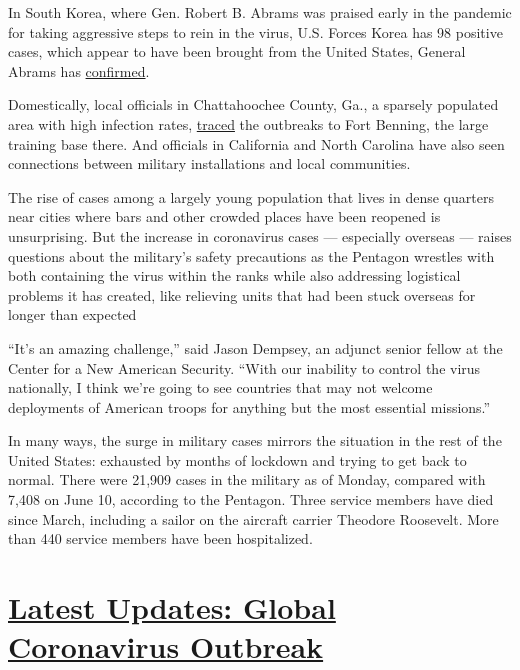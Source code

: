 In South Korea, where Gen. Robert B. Abrams was praised early in the
pandemic for taking aggressive steps to rein in the virus, U.S. Forces
Korea has 98 positive cases, which appear to have been brought from the
United States, General Abrams has
\href{https://en.yna.co.kr/view/AEN20200720007051325}{confirmed}.

Domestically, local officials in Chattahoochee County, Ga., a sparsely
populated area with high infection rates,
\href{https://www.georgiahealthnews.com/2020/06/fort-benning-cases-covid-19-surge-chattahoochee-county/}{traced}
the outbreaks to Fort Benning, the large training base there. And
officials in California and North Carolina have also seen connections
between military installations and local communities.

The rise of cases among a largely young population that lives in dense
quarters near cities where bars and other crowded places have been
reopened is unsurprising. But the increase in coronavirus cases ---
especially overseas --- raises questions about the military's safety
precautions as the Pentagon wrestles with both containing the virus
within the ranks while also addressing logistical problems it has
created, like relieving units that had been stuck overseas for longer
than expected

``It's an amazing challenge,'' said Jason Dempsey, an adjunct senior
fellow at the Center for a New American Security. ``With our inability
to control the virus nationally, I think we're going to see countries
that may not welcome deployments of American troops for anything but the
most essential missions.''

In many ways, the surge in military cases mirrors the situation in the
rest of the United States: exhausted by months of lockdown and trying to
get back to normal. There were 21,909 cases in the military as of
Monday, compared with 7,408 on June 10, according to the Pentagon. Three
service members have died since March, including a sailor on the
aircraft carrier Theodore Roosevelt. More than 440 service members have
been hospitalized.

\hypertarget{latest-updates-global-coronavirus-outbreak}{%
\section{\texorpdfstring{\href{https://www.nytimes.com/2020/08/01/world/coronavirus-covid-19.html?action=click\&pgtype=Article\&state=default\&region=MAIN_CONTENT_1\&context=storylines_live_updates}{Latest
Updates: Global Coronavirus
Outbreak}}{Latest Updates: Global Coronavirus Outbreak}}\label{latest-updates-global-coronavirus-outbreak}}

